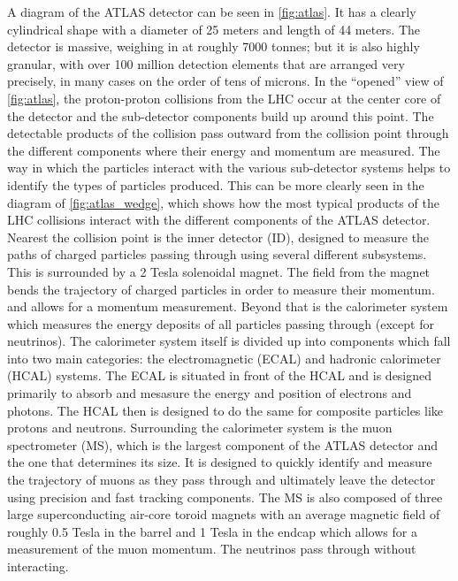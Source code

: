 A diagram of the ATLAS detector can be seen in \fig\ref{fig:atlas}.
It has a clearly cylindrical shape with a diameter of 25 meters
and length of 44 meters. The detector is massive, weighing
in at roughly 7000 tonnes; but it is also highly granular, with
over 100 million detection elements that are arranged very precisely, 
in many cases on the order of tens of microns.
In the ``opened'' view of \fig\ref{fig:atlas}, the proton-proton
collisions from the LHC occur at the center core of the detector
and the sub-detector components build up around this point.
The detectable products of the collision pass outward from the collision
point through the different components where their energy and momentum
are measured. The way in which the particles interact with the various
sub-detector systems helps to identify the types of 
particles produced.
This can be more clearly seen in the diagram of 
\fig\ref{fig:atlas_wedge}, which shows how the most typical
products of the LHC collisions interact with the different
components of the ATLAS detector.
Nearest the collision point is the inner detector (ID), designed to 
measure the paths of charged particles passing through using several
different subsystems. This 
is surrounded by a 2 Tesla solenoidal magnet.
The field from the magnet bends the trajectory of charged particles
in order to measure their momentum.
and allows for a momentum measurement.
Beyond that is the calorimeter system
which measures the energy deposits of all particles passing 
through (except for neutrinos). The calorimeter system 
itself is divided up into components which fall into two main 
categories: the electromagnetic (ECAL)
and hadronic calorimeter (HCAL) systems.
The ECAL is situated in front of the HCAL and is designed
primarily to absorb and mesasure the energy and position of
electrons and photons. 
The HCAL then is designed to do the same for
composite particles like protons and neutrons.
Surrounding the calorimeter system is the muon spectrometer (MS),
which is the largest component of the ATLAS detector and the one
that determines its size. It is designed to quickly identify and measure the 
trajectory of muons as they pass through
and ultimately leave the detector using precision 
and fast tracking components. The MS is also composed of 
three large superconducting air-core toroid magnets with an 
average magnetic field of roughly 0.5 Tesla in the barrel and 
1 Tesla in the endcap which allows for
a measurement of the muon momentum. The neutrinos 
pass through without interacting.

